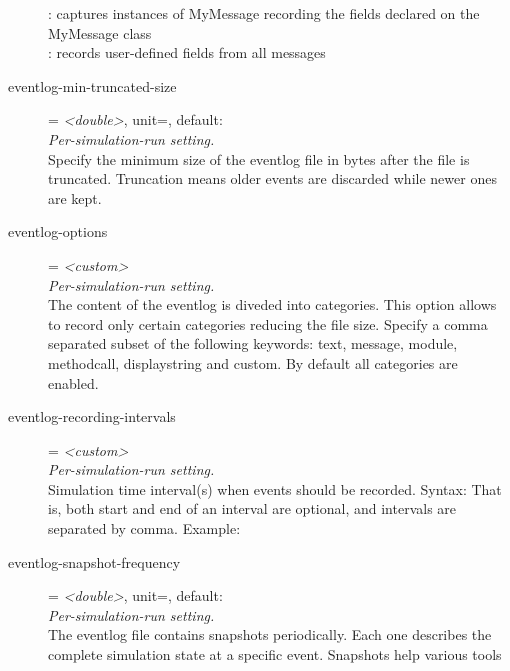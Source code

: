 \begin{description}
    :
    captures instances of MyMessage recording the fields declared on the
    MyMessage class\\
        : records
    user-defined fields from all messages
\item[eventlog-min-truncated-size] = \textit{<double>}, unit=, default: \\
    \textit{Per-simulation-run setting.}\\
    Specify the minimum size of the eventlog file in bytes after the file is
    truncated. Truncation means older events are discarded while newer ones are
    kept.
\item[eventlog-options] = \textit{<custom>}\\
    \textit{Per-simulation-run setting.}\\
    The content of the eventlog is diveded into categories. This option allows
    to record only certain categories reducing the file size. Specify a comma
    separated subset of the following keywords: text, message, module,
    methodcall, displaystring and custom. By default all categories are
    enabled.
\item[eventlog-recording-intervals] = \textit{<custom>}\\
    \textit{Per-simulation-run setting.}\\
    Simulation time interval(s) when events should be recorded. Syntax:
     That is,
    both start and end of an interval are optional, and intervals are separated
    by comma. Example: 
\item[eventlog-snapshot-frequency] = \textit{<double>}, unit=, default: \\
    \textit{Per-simulation-run setting.}\\
    The eventlog file contains snapshots periodically. Each one describes the
    complete simulation state at a specific event. Snapshots help various tools

\end{description}
